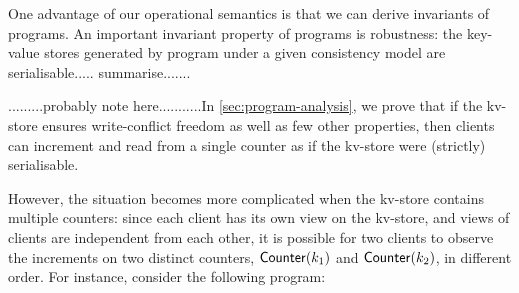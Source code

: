 One advantage of  our operational semantics is that we can derive
invariants of programs. An important invariant property of 
programs is robustness: the key-value stores 
generated by  program under a given 
consistency model are serialisable.....  summarise.......







.........probably note here...........In \cref{sec:program-analysis}, we prove that if the kv-store 
ensures write-conflict freedom as well as few other properties, then clients can increment 
and read from a single counter as if the kv-store were (strictly) serialisable.

However, the situation becomes more complicated when the kv-store contains multiple counters:  
since each client has its own view on the kv-store, and views of clients are independent from each other, it is possible for two 
clients to observe the increments on two distinct counters, $\mathsf{Counter}(k_1)$ and $\mathsf{Counter}(k_2)$, in different order. 
For instance, consider the following program:

